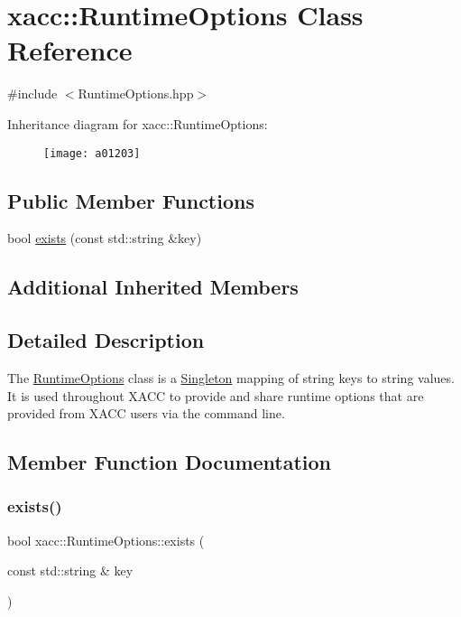 \hypertarget{a01203}{}\section{xacc\+:\+:Runtime\+Options Class Reference}
\label{a01203}


{\ttfamily \#include $<$Runtime\+Options.\+hpp$>$}

Inheritance diagram for xacc\+:\+:Runtime\+Options\+:\begin{figure}[H]
\begin{center}
\leavevmode
\texttt{[image: a01203]}
\end{center}
\end{figure}
\subsection*{Public Member Functions}
\begin{DoxyCompactItemize}
\item 
bool \hyperlink{a01203_a3603aecb87461efedd0fabbef966c80c}{exists} (const std\+::string \&key)
\end{DoxyCompactItemize}
\subsection*{Additional Inherited Members}


\subsection{Detailed Description}
The \hyperlink{a01203}{Runtime\+Options} class is a \hyperlink{a01207}{Singleton} mapping of string keys to string values. It is used throughout X\+A\+CC to provide and share runtime options that are provided from X\+A\+CC users via the command line. 

\subsection{Member Function Documentation}
\mbox{\label{a01203_a3603aecb87461efedd0fabbef966c80c}} 
\subsubsection{\texorpdfstring{exists()}{exists()}}
{\footnotesize\ttfamily bool xacc\+::\+Runtime\+Options\+::exists (\begin{DoxyParamCaption}\item[{const std\+::string \&}]{key }\end{DoxyParamCaption})\hspace{0.3cm}{\ttfamily [inline]}}

